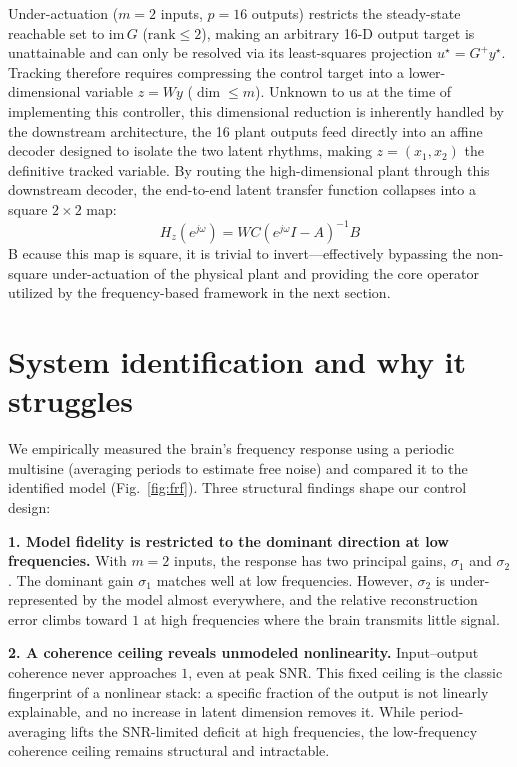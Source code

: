 \documentclass[11pt]{article}
\begin{document}
Under-actuation ($m = 2$ inputs, $p = 16$ outputs) restricts the steady-state reachable 
set to $\mathrm{im}\,G$ ($\mathrm{rank} \le 2$), making an arbitrary 16-D output target is 
unattainable and can only be resolved via its least-squares projection $u^\star = G^{+}y^\star$. 
Tracking therefore requires compressing the control target into a lower-dimensional variable 
$z = Wy$ ($\dim \le m$). Unknown to us at the time of implementing this controller, this dimensional reduction is inherently handled by the 
downstream architecture, the 16 plant outputs feed directly into an affine decoder designed 
to isolate the two latent rhythms, making $z = (x_1, x_2)$ the definitive tracked variable. 
By routing the high-dimensional plant through this downstream decoder, the end-to-end latent 
transfer function collapses into a square $2 \times 2$ map:$$H_z(e^{j\omega}) = WC(e^{j\omega}I - A)^{-1}B$$B
ecause this map is square, it is trivial to invert—effectively bypassing the non-square under-actuation of the 
physical plant and providing the core operator utilized by the frequency-based framework in the next section.

\section{System identification and why it struggles}
\label{sec:sysid}
We empirically measured the brain's frequency response using a periodic multisine 
(averaging periods to estimate free noise) and compared it to the identified model 
(Fig.~\ref{fig:frf}). Three structural findings shape our control design:

\textbf{1. Model fidelity is restricted to the dominant direction at low frequencies.} With $m{=}2$ inputs, 
the response has two principal gains, $\sigma_1$ and $\sigma_2$. The dominant gain $\sigma_1$ 
matches well at low frequencies. However, $\sigma_2$ is under-represented by the model almost everywhere, and the relative reconstruction 
error climbs toward $1$ at high frequencies where the brain transmits little signal.

\textbf{2. A coherence ceiling reveals unmodeled nonlinearity.} Input–output coherence never approaches 
$1$, even at peak SNR. This fixed ceiling is the classic fingerprint of a nonlinear stack: 
a specific fraction of the output is not linearly explainable, and no increase in latent 
dimension removes it. While period-averaging lifts the SNR-limited deficit at high frequencies, 
the low-frequency coherence ceiling remains structural and intractable.
\end{document}
